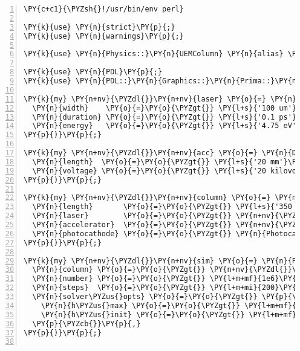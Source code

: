 \begin{Verbatim}[commandchars=\\\{\},numbers=left,firstnumber=1,stepnumber=1]
\PY{c+c1}{\PYZsh{}!/usr/bin/env perl}

\PY{k}{use} \PY{n}{strict}\PY{p}{;}
\PY{k}{use} \PY{n}{warnings}\PY{p}{;}

\PY{k}{use} \PY{n}{Physics::}\PY{n}{UEMColumn} \PY{n}{alias} \PY{o}{=}\PY{o}{\PYZgt{}} \PY{l+s}{':standard'}\PY{p}{;}

\PY{k}{use} \PY{n}{PDL}\PY{p}{;}
\PY{k}{use} \PY{n}{PDL::}\PY{n}{Graphics::}\PY{n}{Prima::}\PY{n}{Simple} \PY{p}{[}\PY{l+m+mi}{700}\PY{p}{,}\PY{l+m+mi}{500}\PY{p}{]}\PY{p}{;}

\PY{k}{my} \PY{n+nv}{\PYZdl{}}\PY{n+nv}{laser} \PY{o}{=} \PY{n}{Laser}\PY{o}{-}\PY{o}{\PYZgt{}}\PY{k}{new}\PY{p}{(}
  \PY{n}{width}    \PY{o}{=}\PY{o}{\PYZgt{}} \PY{l+s}{'100 um'}\PY{p}{,}
  \PY{n}{duration} \PY{o}{=}\PY{o}{\PYZgt{}} \PY{l+s}{'0.1 ps'}\PY{p}{,}
  \PY{n}{energy}   \PY{o}{=}\PY{o}{\PYZgt{}} \PY{l+s}{'4.75 eV'}\PY{p}{,}
\PY{p}{)}\PY{p}{;}

\PY{k}{my} \PY{n+nv}{\PYZdl{}}\PY{n+nv}{acc} \PY{o}{=} \PY{n}{DCAccelerator}\PY{o}{-}\PY{o}{\PYZgt{}}\PY{k}{new}\PY{p}{(}
  \PY{n}{length}  \PY{o}{=}\PY{o}{\PYZgt{}} \PY{l+s}{'20 mm'}\PY{p}{,}
  \PY{n}{voltage} \PY{o}{=}\PY{o}{\PYZgt{}} \PY{l+s}{'20 kilovolts'}\PY{p}{,}
\PY{p}{)}\PY{p}{;}

\PY{k}{my} \PY{n+nv}{\PYZdl{}}\PY{n+nv}{column} \PY{o}{=} \PY{n}{Column}\PY{o}{-}\PY{o}{\PYZgt{}}\PY{k}{new}\PY{p}{(}
  \PY{n}{length}       \PY{o}{=}\PY{o}{\PYZgt{}} \PY{l+s}{'350 mm'}\PY{p}{,} 
  \PY{n}{laser}        \PY{o}{=}\PY{o}{\PYZgt{}} \PY{n+nv}{\PYZdl{}}\PY{n+nv}{laser}\PY{p}{,}
  \PY{n}{accelerator}  \PY{o}{=}\PY{o}{\PYZgt{}} \PY{n+nv}{\PYZdl{}}\PY{n+nv}{acc}\PY{p}{,}
  \PY{n}{photocathode} \PY{o}{=}\PY{o}{\PYZgt{}} \PY{n}{Photocathode}\PY{o}{-}\PY{o}{\PYZgt{}}\PY{k}{new}\PY{p}{(} \PY{n}{work\PYZus{}function} \PY{o}{=}\PY{o}{\PYZgt{}} \PY{l+s}{'4.25 eV'} \PY{p}{)}\PY{p}{,} \PY{c+c1}{\PYZsh{} Ta}
\PY{p}{)}\PY{p}{;}

\PY{k}{my} \PY{n+nv}{\PYZdl{}}\PY{n+nv}{sim} \PY{o}{=} \PY{n}{Physics::}\PY{n}{UEMColumn}\PY{o}{-}\PY{o}{\PYZgt{}}\PY{k}{new}\PY{p}{(}
  \PY{n}{column} \PY{o}{=}\PY{o}{\PYZgt{}} \PY{n+nv}{\PYZdl{}}\PY{n+nv}{column}\PY{p}{,}
  \PY{n}{number} \PY{o}{=}\PY{o}{\PYZgt{}} \PY{l+m+mf}{1e6}\PY{p}{,}
  \PY{n}{steps}  \PY{o}{=}\PY{o}{\PYZgt{}} \PY{l+m+mi}{200}\PY{p}{,}
  \PY{n}{solver\PYZus{}opts} \PY{o}{=}\PY{o}{\PYZgt{}} \PY{p}{\PYZob{}}
    \PY{n}{h\PYZus{}max} \PY{o}{=}\PY{o}{\PYZgt{}} \PY{l+m+mf}{5e-13}\PY{p}{,}
    \PY{n}{h\PYZus{}init} \PY{o}{=}\PY{o}{\PYZgt{}} \PY{l+m+mf}{5e-14}\PY{p}{,}
  \PY{p}{\PYZcb{}}\PY{p}{,}
\PY{p}{)}\PY{p}{;}


\end{Verbatim}
